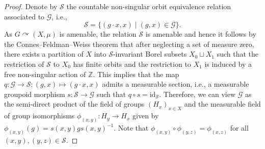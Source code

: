 \documentclass[11pt,a4paper]{article}
\theoremstyle{definition}
\theoremstyle{remark}
\numberwithin{equation}{section}
\numberwithin{theorem}{section}
\newcommand{\Z}{\mathbb{Z}}
\newcommand{\acts}{\curvearrowright}
\begin{document}
\begin{proof}
Denote by $\mathcal{S}$ the countable non-singular orbit equivalence relation associated to $\mathcal{G}$, i.e.,
\[\mathcal{S}=\{(g \cdot x,x) \mid (g,x) \in \mathcal{G}\}.\]
As $G \acts (X,\mu)$ is amenable, the relation $\mathcal{S}$ is amenable and hence it follows by the Connes--Feldman--Weiss theorem \cite{ConnesFeldmanWeiss81} that after neglecting a set of measure zero, there exists a partition of $X$ into $\mathcal{S}$-invariant Borel subsets $X_0\sqcup X_1$ such that the restriction of $\mathcal{S}$ to $X_0$ has finite orbits and the restriction to $X_1$ is induced by a free non-singular action of $\Z$. 
This implies that the map $q \colon \mathcal{G} \rightarrow \mathcal{S}\colon (g,x) \mapsto (g \cdot x,x)$ admits a measurable section, i.e., a measurable groupoid morphism $s \colon \mathcal{S} \rightarrow \mathcal{G}$ such that $q \circ s = \mathrm{id}_\mathcal{S}$. 
Therefore, we can view $\mathcal{G}$ as the semi-direct product of the field of groups $(H_x)_{x \in X}$ and the measurable field of group isomorphisms $\phi_{(x,y)}\colon H_y \rightarrow H_x$ given by $\phi_{(x,y)}(g)= s(x,y) g s(x,y)^{-1}$.
Note that $\phi_{(x,y)} \circ \phi_{(y,z)} = \phi_{(x,z)}$ for all $(x,y), (y,z) \in \mathcal{S}$.


\end{proof}
\end{document}
